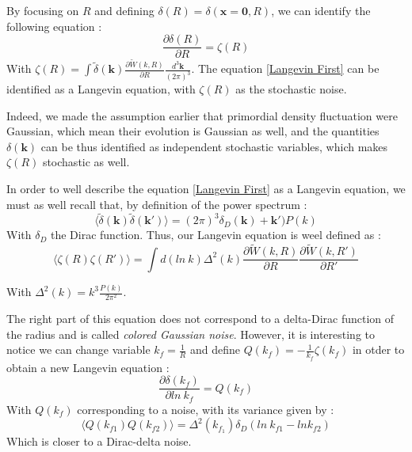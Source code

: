 By focusing on $R$ and defining $\delta(R) = \delta (\textbf{x}=\textbf{0}, R)$, we can identify the following equation :
\begin{equation}
\label{Langevin First}
\frac{\partial \delta(R)}{\partial R} = \zeta (R)
\end{equation}
With $\zeta(R) = \int \widetilde{\delta} (\textbf{k}) \frac{\partial \widetilde{W}(k, R)}{\partial R} \frac{d^3 \textbf{k}}{(2\pi)^3} $.
The equation \ref{Langevin First} can be identified as a Langevin equation, with $\zeta(R)$  as the stochastic noise.

Indeed, we made the assumption earlier that primordial density fluctuation were Gaussian, which mean their evolution is Gaussian as well, and the quantities $\delta(\textbf{k})$ can be thus identified as independent stochastic variables, which makes $\zeta(R)$ stochastic as well.

In order to well describe the equation \ref{Langevin First} as a Langevin equation, we must as well recall that, by definition of the power spectrum :
\begin{equation}
\langle \widetilde{\delta} (\textbf{k}) \widetilde{\delta} (\textbf{k}') \rangle = (2\pi)^3 \delta_D (\textbf{k}) + \textbf{k}') P(k)
\end{equation}
With $\delta_D$ the Dirac function. Thus, our Langevin equation is weel defined as :
\begin{equation}
\langle \zeta (R) \zeta (R') \rangle = \int d(ln \ k) \Delta^2(k) \frac{\partial \widetilde{W}(k, R)}{\partial R} \frac{\partial \widetilde{W}(k, R')}{\partial R'}
\end{equation}

With $\Delta^2(k) = k^3 \frac{P(k)}{2\pi^2}$.

The right part of this equation does not correspond to a delta-Dirac function of the radius and is called \textit{colored Gaussian noise}. However, it is interesting to notice we can change variable $k_f = \frac{1}{R}$ and define $Q(k_f) = -\frac{1}{k_f} \zeta(k_f)$ in otder to obtain a new Langevin equation :
\begin{equation}
\label{Langevin Second}
\frac{\partial \delta(k_f)}{\partial ln \ k_f} = Q (k_f)
\end{equation}
With $Q(k_f)$ corresponding to a noise, with its variance given by :
\begin{equation}
\langle Q (k_{f1}) Q (k_{f2}) \rangle = \Delta^2(k_{f_1}) \delta_D (ln \ k_{f1} - ln k_{f2})
\end{equation}
Which is closer to a Dirac-delta noise.


